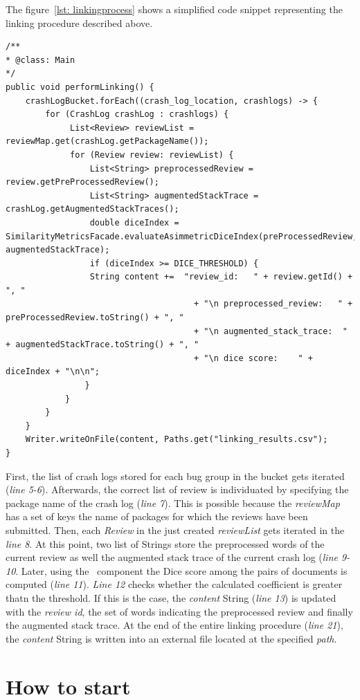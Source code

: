 The figure~\ref{lst: linkingprocess} shows a simplified code snippet representing the linking procedure described above. 
\begin{lstlisting}[caption=Linking process,label={lst: linkingprocess}]
/**
* @class: Main
*/
public void performLinking() {
	crashLogBucket.forEach((crash_log_location, crashlogs) -> {
		for (CrashLog crashLog : crashlogs) {
			 List<Review> reviewList = reviewMap.get(crashLog.getPackageName());
			 for (Review review: reviewList) {
			 	 List<String> preprocessedReview = review.getPreProcessedReview();	
			 	 List<String> augmentedStackTrace = crashLog.getAugmentedStackTraces();
			 	 double diceIndex = SimilarityMetricsFacade.evaluateAsimmetricDiceIndex(preProcessedReview, augmentedStackTrace);
			 	 if (diceIndex >= DICE_THRESHOLD) {	 
			 	 String content +=	"review_id:   " + review.getId() + ", "
	                                  + "\n preprocessed_review:   " + preProcessedReview.toString() + ", "
	                                  + "\n augmented_stack_trace:  " + augmentedStackTrace.toString() + ", "
	                                  + "\n dice score:    " + diceIndex + "\n\n";                     
			 	}
			}
		}
	}
	Writer.writeOnFile(content, Paths.get("linking_results.csv");
}
\end{lstlisting}
First, the list of crash logs stored for each bug group in the bucket gets iterated (\textit{line 5-6}). 
Afterwards, the correct list of review is individuated by specifying the package name of the crash log (\textit{line 7}). This is possible because the \textit{reviewMap} has a set of keys the name of packages for which the reviews have been submitted. 
Then, each \textit{Review} in the just created \textit{reviewList} gets iterated in the \textit{line 8}.
At this point, two list of Strings store the preprocessed words of the current review as well the augmented stack trace of the current crash log (\textit{line 9-10}.
Later, using the \Facade\ component the Dice score among the pairs of documents is computed (\textit{line 11}). 
\textit{Line 12} checks whether the calculated coefficient is greater thatn the threshold. 
If this is the case, the \textit{content} String (\textit{line 13}) is updated with 
the \textit{review id}, the set of words indicating the preprocessed review and finally the augmented stack trace. 
At the end of the entire linking procedure (\textit{line 21}), the \textit{content} String is written into an external file located at the specified \textit{path}.


\section{How to start \toolname}


